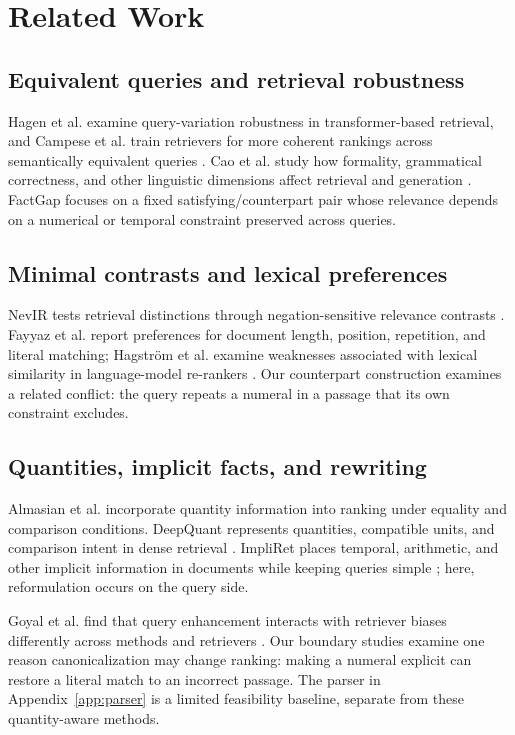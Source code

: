 \documentclass[conference,letterpaper]{IEEEtran}
\begin{document}
\section{Related Work}
\subsection{Equivalent queries and retrieval robustness}
Hagen et al. examine query-variation robustness in transformer-based retrieval, and Campese et al. train retrievers for more coherent rankings across semantically equivalent queries \cite{hagen-etal-2024-revisiting,campese-etal-2025-improving}. Cao et al. study how formality, grammatical correctness, and other linguistic dimensions affect retrieval and generation \cite{cao-etal-2026-style}. FactGap focuses on a fixed satisfying/counterpart pair whose relevance depends on a numerical or temporal constraint preserved across queries.

\subsection{Minimal contrasts and lexical preferences}
NevIR tests retrieval distinctions through negation-sensitive relevance contrasts \cite{weller-etal-2024-nevir}. Fayyaz et al. report preferences for document length, position, repetition, and literal matching; Hagstr\"om et al. examine weaknesses associated with lexical similarity in language-model re-rankers \cite{fayyaz-etal-2025-collapse,hagstrom-etal-2025-language}. Our counterpart construction examines a related conflict: the query repeats a numeral in a passage that its own constraint excludes.

\subsection{Quantities, implicit facts, and rewriting}
Almasian et al. incorporate quantity information into ranking under equality and comparison conditions. DeepQuant represents quantities, compatible units, and comparison intent in dense retrieval \cite{almasian-etal-2024-numbers,agrawal-etal-2025-deepquant}. ImpliRet places temporal, arithmetic, and other implicit information in documents while keeping queries simple \cite{taghavi-etal-2025-impliret}; here, reformulation occurs on the query side.

Goyal et al. find that query enhancement interacts with retriever biases differently across methods and retrievers \cite{goyal-etal-2026-masking}. Our boundary studies examine one reason canonicalization may change ranking: making a numeral explicit can restore a literal match to an incorrect passage. The parser in Appendix~\ref{app:parser} is a limited feasibility baseline, separate from these quantity-aware methods.
\end{document}
